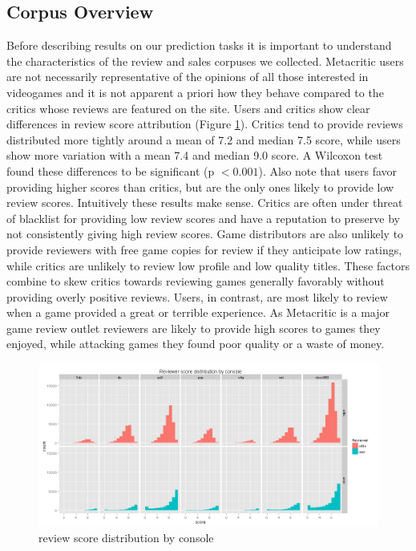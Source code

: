 \documentclass[letterpaper]{article}
\begin{document}
\subsection{Corpus Overview}
Before describing results on our prediction tasks it is important to understand the characteristics of the review and sales corpuses we collected. Metacritic users are not necessarily representative of the opinions of all those interested in videogames and it is not apparent a priori how they behave compared to the critics whose reviews are featured on the site.
Users and critics show clear differences in review score attribution (Figure \ref{fig:revscore_console}). Critics tend to provide reviews distributed more tightly around a mean of 7.2 and median 7.5 score, while users show more variation with a mean 7.4 and median 9.0 score. A Wilcoxon test found these differences to be significant (p $< 0.001$). Also note that users favor providing higher scores than critics, but are the only ones likely to provide low review scores.
Intuitively these results make sense. Critics are often under threat of blacklist for providing low review scores and have a reputation to preserve by not consistently giving high review scores. Game distributors are also unlikely to provide reviewers with free game copies for review if they anticipate low ratings, while critics are unlikely to review low profile and low quality titles. These factors combine to skew critics towards reviewing games generally favorably without providing overly positive reviews. Users, in contrast, are most likely to review when a game provided a great or terrible experience. As Metacritic is a major game review outlet reviewers are likely to provide high scores to games they enjoyed, while attacking games they found poor quality or a waste of money.

\begin{figure}[tbph]
\centering
\includegraphics[width=\linewidth]{./review_score_hist}
\caption{review score distribution by console}
\label{fig:revscore_console}
\end{figure}
\end{document}
